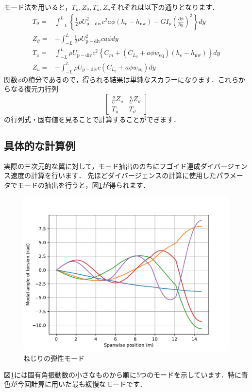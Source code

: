 \documentclass{jarticle}
\begin{document}
モード法を用いると，$T_\vartheta,Z_\vartheta,T_u,Z_u$それぞれは以下の通りとなります．
\begin{align}
    T_\vartheta =& \int_{-L}^{L} \left\{ \frac{1}{2}\rho U_\mathrm{p-div}^2 c^2 a \phi  (h_\mathrm{e}-h_\mathrm{nw}) - GI_p\left( \frac{\partial \phi}{\partial y} \right)^2 \right\} dy \\
    Z_\vartheta =& -\int_{-L}^L \frac{1}{2}\rho U_\mathrm{p-div}^2 c a \phi dy \\
    T_u =& \int_{-L}^L \rho U_\mathrm{p-div} c^2 \left\{ C_m +  (C_{L_0} + a\phi w_\mathrm{eq})  (h_\mathrm{e}-h_\mathrm{nw}) \right\} dy \\
    Z_u =& -\int_{-L}^L \rho U_\mathrm{p-div} c (C_{L_0} + a\phi w_\mathrm{eq}) dy
\end{align}
関数$\phi$の積分であるので，得られる結果は単純なスカラーになります．これらからなる復元力行列
\begin{equation}
    \begin{bmatrix}
        \frac{g}{U}Z_u & \frac{g}{U}Z_\vartheta \\
        T_u & T_\vartheta
    \end{bmatrix}
\end{equation}
の行列式・固有値を見ることで計算することができます．

\subsection{具体的な計算例}

実際の三次元的な翼に対して，モード抽出ののちにフゴイド連成ダイバージェンス速度の計算を行います．
先ほどダイバージェンスの計算に使用したパラメータでモードの抽出を行うと，図\ref{mode}が得られます．
\begin{figure}[H]
    \centering
    \includegraphics[width=0.7\linewidth]{image/theta_mode.pdf}
    \caption{ねじりの弾性モード}
    \label{mode}
\end{figure}
図\ref{mode}には固有角振動数の小さなものから順に5つのモードを示しています．特に青色が今回計算に用いた最も緩慢なモードです．
\end{document}
